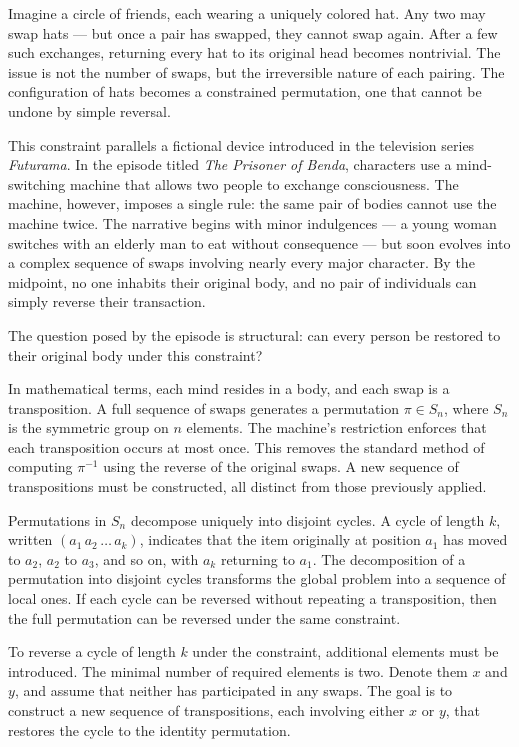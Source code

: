 Imagine a circle of friends, each wearing a uniquely colored hat. Any two may swap hats — but once a pair has swapped, they cannot swap again. After a few such exchanges, returning every hat to its original head becomes nontrivial. The issue is not the number of swaps, but the irreversible nature of each pairing. The configuration of hats becomes a constrained permutation, one that cannot be undone by simple reversal.

This constraint parallels a fictional device introduced in the television series \textit{Futurama}. In the episode titled \textit{The Prisoner of Benda}, characters use a mind-switching machine that allows two people to exchange consciousness. The machine, however, imposes a single rule: the same pair of bodies cannot use the machine twice. The narrative begins with minor indulgences — a young woman switches with an elderly man to eat without consequence — but soon evolves into a complex sequence of swaps involving nearly every major character. By the midpoint, no one inhabits their original body, and no pair of individuals can simply reverse their transaction.

The question posed by the episode is structural: can every person be restored to their original body under this constraint?

In mathematical terms, each mind resides in a body, and each swap is a transposition. A full sequence of swaps generates a permutation \( \pi \in S_n \), where \( S_n \) is the symmetric group on \( n \) elements. The machine’s restriction enforces that each transposition occurs at most once. This removes the standard method of computing \( \pi^{-1} \) using the reverse of the original swaps. A new sequence of transpositions must be constructed, all distinct from those previously applied.

Permutations in \( S_n \) decompose uniquely into disjoint cycles. A cycle of length \( k \), written \( (a_1\, a_2\, \dots\, a_k) \), indicates that the item originally at position \( a_1 \) has moved to \( a_2 \), \( a_2 \) to \( a_3 \), and so on, with \( a_k \) returning to \( a_1 \). The decomposition of a permutation into disjoint cycles transforms the global problem into a sequence of local ones. If each cycle can be reversed without repeating a transposition, then the full permutation can be reversed under the same constraint.

To reverse a cycle of length \( k \) under the constraint, additional elements must be introduced. The minimal number of required elements is two. Denote them \( x \) and \( y \), and assume that neither has participated in any swaps. The goal is to construct a new sequence of transpositions, each involving either \( x \) or \( y \), that restores the cycle to the identity permutation.

